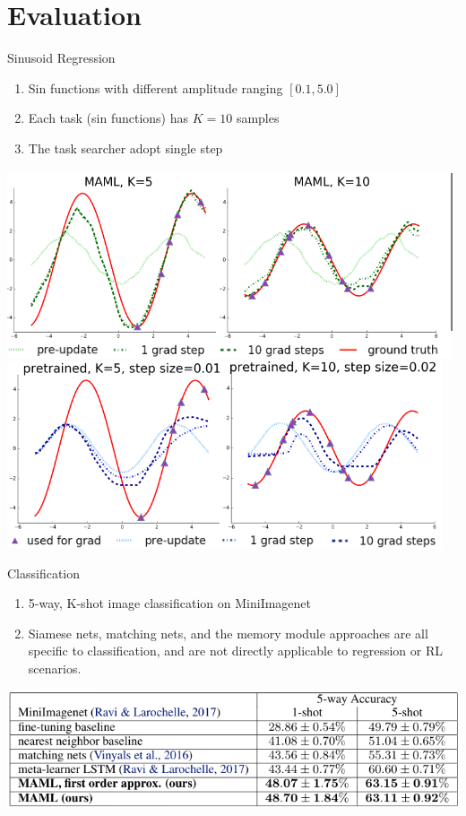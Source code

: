 \documentclass[compress]{beamer}
\begin{document}
\section{Evaluation}
\begin{frame}[t]{Sinusoid Regression}
    \begin{enumerate}
        \item Sin functions with different amplitude ranging $[0.1,5.0]$
        \item Each task (sin functions) has $K=10$ samples
        \item The task searcher adopt single step
    \end{enumerate}
    \begin{center}
        \includegraphics[height=.3\textheight,width=\textwidth]{sinexp1}
        \includegraphics[height=.3\textheight,width=\textwidth]{sinexp2}
    \end{center}
\end{frame}

\begin{frame}{Classification}
    \begin{enumerate}
        \item 5-way, K-shot image classification on MiniImagenet
        \item Siamese nets, matching nets, and the memory module approaches are all specific to classification, and are not directly applicable to regression or RL scenarios.
    \end{enumerate}
    \begin{center}
        \includegraphics[height=.5\textheight,width=\textwidth]{classificationexp}
    \end{center}
\end{frame}
\end{document}
